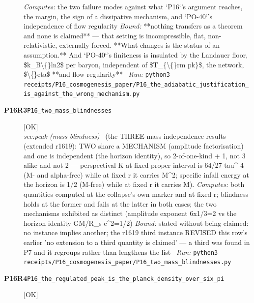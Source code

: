 \begin{description}
\emph{Computes:} the two failure modes against what `P16`'s argument reaches, the margin, the sign of a dissipative mechanism, and `PO-40`'s independence of flow regularity
 \emph{Bound:}  **nothing transfers as a theorem and none is claimed** --- that setting is incompressible, flat, non-relativistic, externally forced. **What changes is the status of an assumption.** And `PO-40`'s finiteness is insulated by the Landauer floor, \$k\_B\textbackslash\{\}ln2\$ per baryon, independent of \$T\_\{\textbackslash\{\}rm pk\}\$, the network, \$\textbackslash\{\}eta\$ **and flow regularity**
\ \emph{Run:} \texttt{python3 receipts/P16\_cosmogenesis\_paper/P16\_the\_adiabatic\_justification\_is\_against\_the\_wrong\_mechanism.py}
\item[\rcptlabel{P16_two_mass_blindnesses}{P16R3}\textbf{P16R3}\quad\texttt{P16\_two\_mass\_blindnesses}]\hfill\textsf{[OK]}\\
\textit{sec:peak (mass-blindness)} \ (the THREE mass-independence results (extended r1619): TWO share a MECHANISM (amplitude factorisation) and one is independent (the horizon identity), so 2-of-one-kind + 1, not 3 alike and not 2 --- perspectival K at fixed proper interval is 64/27 tau\textasciicircum{}-4 (M- and alpha-free) while at fixed r it carries M\textasciicircum{}2; specific infall energy at the horizon is 1/2 (M-free) while at fixed r it carries M). 
\emph{Computes:} both quantities computed at the collapse's own marker and at fixed r; blindness holds at the former and fails at the latter in both cases; the two mechanisms exhibited as distinct (amplitude exponent 6x1/3=2 vs the horizon identity GM/R\_s c\textasciicircum{}2=1/2)
 \emph{Bound:} stated without being claimed: no instance implies another; the r1619 third instance REVISED this row's earlier 'no extension to a third quantity is claimed' --- a third was found in P7 and it regroups rather than lengthens the list
\ \emph{Run:} \texttt{python3 receipts/P16\_cosmogenesis\_paper/P16\_two\_mass\_blindnesses.py}
\item[\rcptlabel{P16_the_regulated_peak_is_the_planck_density_over_six_pi}{P16R4}\textbf{P16R4}\quad\texttt{P16\_the\_regulated\_peak\_is\_the\_planck\_density\_over\_six\_pi}]\hfill\textsf{[OK]}\\

\end{description}
